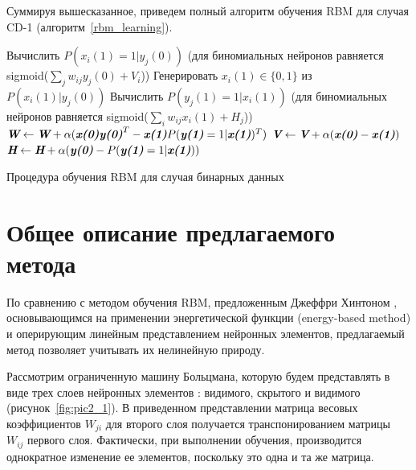 Суммируя вышесказанное, приведем полный алгоритм обучения RBM для случая CD-1 (алгоритм~\ref{rbm_learning}).

\begin{algo}[h]
	
	{
		Вычислить $P(x_{i}(1)=1|y_j(0))$ (для биномиальных нейронов равняется sigmoid($\sum_{j}{w_{ij}y_{j}(0)} + V_i$))\;
		Генерировать $x_{i}(1) \in \{0, 1\}$ из $P(x_{i}(1)|y_j(0))$\;
	}	
	{
		Вычислить $P(y_{j}(1)=1|x_i(1))$ (для биномиальных нейронов равняется sigmoid($\sum_{i}{w_{ij}x_{i}(1)} + H_j$))\;
	}
	$\textit{\textbf{W}} \leftarrow \textit{\textbf{W}} + \alpha(\textbf{\textit{x(0)}}\textit{\textbf{y(0)}}^T - \textit{\textbf{x(1)}}P(\textit{\textbf{y(1)}}=1|\textit{\textbf{x(1)}})^T)$\;
	$\textit{\textbf{V}} \leftarrow \textit{\textbf{V}} + \alpha(\textit{\textbf{x(0)}} - \textit{\textbf{x(1)}})$\;
	$\textit{\textbf{H}} \leftarrow \textit{\textbf{H}} + \alpha(\textit{\textbf{y(0)}} - P(\textit{\textbf{y(1)}}=1|\textit{\textbf{x(1)}}))$\;
    \caption{Процедура обучения RBM для случая бинарных данных}
	\label{rbm_learning}
\end{algo}

\section{Общее описание предлагаемого метода}

По сравнению с методом обучения RBM, предложенным Джеффри Хинтоном \cite{n1}, основывающимся на применении энергетической функции (energy-based method) и оперирующим линейным представлением нейронных элементов, предлагаемый метод позволяет учитывать их нелинейную природу. 
 
Рассмотрим ограниченную машину Больцмана, которую будем представлять в виде трех слоев нейронных элементов \cite{n10}: видимого, скрытого и видимого (рисунок~\ref{fig:pic2_1}). В приведенном представлении матрица весовых коэффициентов $W_{ji}$ для второго слоя получается транспонированием матрицы $W_{ij}$ первого слоя. Фактически, при выполнении обучения, производится однократное изменение ее элементов, поскольку это одна и та же матрица.

